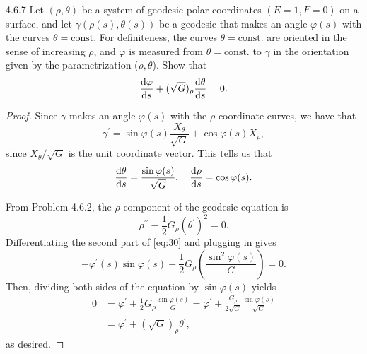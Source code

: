\documentclass[11pt]{article}
\begin{document}
\begin{problem}{4.6.7}
  Let \( (\rho,\theta) \) be a system of geodesic polar coordinates \( (E=1, F=0) \) on a surface, and let \( \gamma(\rho(s),\theta(s)) \) be a geodesic that makes an angle \(\varphi(s)\) with the curves \( \theta = \text{const.} \) For definiteness, the curves \(\theta = \text{const.}\) are oriented in the sense of increasing \(\rho\), and \(\varphi\) is measured from \(\theta = \text{const.}\) to \(\gamma\) in the orientation given by the parametrization (\(\rho,\theta\)).
  Show that
  \begin{equation}
  \label{eq:6}
  \dv{\varphi}{s} + (\sqrt{G})_{\rho}\dv{\theta}{s} = 0.
  \end{equation}
\end{problem}
\begin{proof}
  Since \(\gamma\) makes an angle \(\varphi(s)\) with the \(\rho\)-coordinate curves, we have that
  \begin{equation}
  \label{eq:29}
  \gamma^{\prime} = \sin\varphi(s) \frac{X_{\theta}}{\sqrt{G}} + \cos\varphi(s) X_{\rho},
\end{equation}
since \( X_{\theta}/\sqrt{G} \) is the unit coordinate vector.
This tells us that
\begin{equation}
\label{eq:30}
\dv{\theta}{s} = \frac{\sin\varphi(s)}{\sqrt{G}}, \quad \dv{\rho}{s} = \cos\varphi(s).
\end{equation}

From Problem 4.6.2, the \(\rho\)-component of the geodesic equation is
\begin{equation}
\label{eq:31}
\rho^{\prime\prime} - \frac{1}{2}G_{\rho}(\theta^{\prime})^2 = 0.
\end{equation}
Differentiating the second part of \cref{eq:30} and plugging in gives
\begin{equation}
\label{eq:32}
-\varphi^{\prime}(s)\sin\varphi(s) - \frac{1}{2}G_{\rho}(\frac{\sin^2\varphi(s)}{G}) = 0.
\end{equation}
Then, dividing both sides of the equation by \(\sin\varphi(s)\) yields
\begin{equation}
\label{eq:33}
\begin{aligned}
  0 &= \varphi^{\prime} + \frac{1}{2}G_{\rho} \frac{\sin\varphi(s)}{G} = \varphi^{\prime} + \frac{G_{\rho}}{2 \sqrt{G}} \frac{\sin\varphi(s)}{\sqrt{G}} \\
  &= \varphi^{\prime} + (\sqrt{G})_{\rho} \theta^{\prime},
\end{aligned}
\end{equation}
as desired.
\end{proof}
\end{document}
